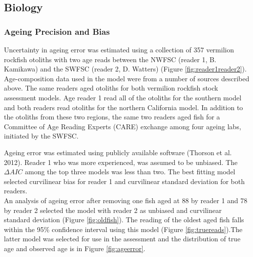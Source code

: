 \documentclass[11pt,
  english,
  a4paper,
]{article}
\begin{document}

\hypertarget{biology}{%
\subsection{Biology}\label{biology}}

\leavevmode\tagmcend\tagstructend


\hypertarget{ageing-precision-and-bias}{%
\subsubsection{Ageing Precision and Bias}\label{ageing-precision-and-bias}}

\leavevmode\tagmcend\tagstructend

Uncertainty in ageing error was estimated using a collection of 357 vermilion rockfish otoliths with two age reads between the NWFSC (reader 1, B. Kamikawa) and the SWFSC (reader 2, D. Watters) (Figure \ref{fig:reader1reader2}). Age-composition data used in the model were from a number of sources described above. The same readers aged otoliths for both vermilion rockfish stock assessment models. Age reader 1 read all of the otoliths for the southern model and both readers read otoliths for the northern California model. In addition to the otoliths from these two regions, the same two readers aged fish for a Committee of Age Reading Experts (CARE) exchange among four ageing labs, initiated by the SWFSC.

Ageing error was estimated using publicly available software {(Thorson et al. 2012)\leavevmode\tagmcend\tagstructend}. Reader 1 who was more experienced, was assumed to be unbiased. The {\(\Delta AIC\)\leavevmode\tagmcend\tagstructend} among the top three models was less than two. The best fitting model selected curvilinear bias for reader 1 and curvilinear standard deviation for both readers.\\
An analysis of ageing error after removing one fish aged at 88 by reader 1 and 78 by reader 2 selected the model with reader 2 as unbiased and curvilinear standard deviation (Figure \ref{fig:oldfish}). The reading of the oldest aged fish falls within the 95\% confidence interval using this model (Figure \ref{fig:truereads}).The latter model was selected for use in the assessment and the distribution of true age and observed age is in Figure \ref{fig:ageerror}.
\end{document}
